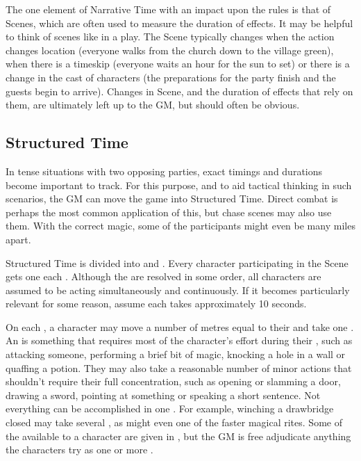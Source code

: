 The one element of Narrative Time with an impact upon the rules is that of Scenes, which are often used to measure the duration of effects.
It may be helpful to think of scenes like in a play.
The Scene typically changes when the action changes location (everyone walks from the church down to the village green), when there is a timeskip (everyone waits an hour for the sun to set) or there is a change in the cast of characters (the preparations for the party finish and the guests begin to arrive).
Changes in Scene, and the duration of effects that rely on them, are ultimately left up to the GM, but should often be obvious.

\subsection{Structured Time}

In tense situations with two opposing parties, exact timings and durations become important to track.
For this purpose, and to aid tactical thinking in such scenarios, the GM can move the game into Structured Time.
Direct combat is perhaps the most common application of this, but chase scenes may also use them.
With the correct magic, some of the participants might even be many miles apart.

Structured Time is divided into {\rounds} and {\turns}.
Every character participating in the Scene gets one {\turn} each {\round}.
Although the {\turns} are resolved in some order, all characters are assumed to be acting simultaneously and continuously.
If it becomes particularly relevant for some reason, assume each {\round} takes approximately 10 seconds.

On each {\turn}, a character may move a number of metres equal to their  and take one {\action}.
An {\action} is something that requires most of the character's effort during their {\turn}, such as attacking someone, performing a brief bit of magic, knocking a hole in a wall or quaffing a potion.
They may also take a reasonable number of minor actions that shouldn't require their full concentration, such as opening or slamming a door, drawing a sword, pointing at something or speaking a short sentence.
Not everything can be accomplished in one {\action}.
For example, winching a drawbridge closed may take several {\actions}, as might even one of the faster magical rites.
Some of the {\actions} available to a character are given in , but the GM is free adjudicate anything the characters try as one or more {\actions}.

